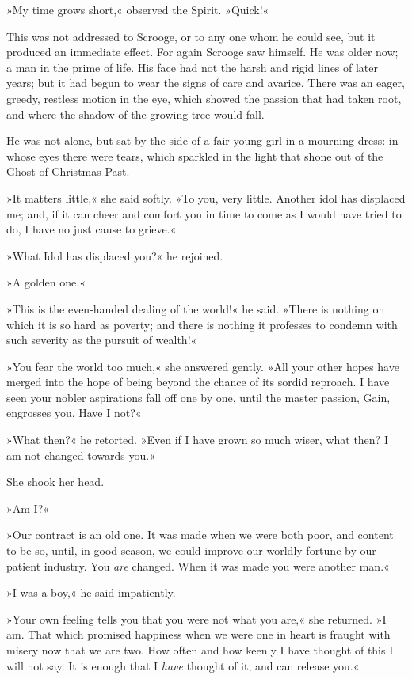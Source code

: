 »My time grows short,« observed the Spirit. »Quick!«

This was not addressed to Scrooge, or to any one whom he could see, but it produced an immediate effect. For again Scrooge saw himself. He was older now; a man in the prime of life. His face had not the harsh and rigid lines of later years; but it had begun to wear the signs of care and avarice. There was an eager, greedy, restless motion in the eye, which showed the passion that had taken root, and where the shadow of the growing tree would fall.

He was not alone, but sat by the side of a fair young girl in a mourning dress: in whose eyes there were tears, which sparkled in the light that shone out of the Ghost of Christmas Past.

»It matters little,« she said softly. »To you, very little. Another idol has displaced me; and, if it can cheer and comfort you in time to come as I would have tried to do, I have no just cause to grieve.«

»What Idol has displaced you?« he rejoined.

»A golden one.«

»This is the even-handed dealing of the world!« he said. »There is nothing on which it is so hard as poverty; and there is nothing it professes to condemn with such severity as the pursuit of wealth!«

»You fear the world too much,« she answered gently. »All your other hopes have merged into the hope of being beyond the chance of its sordid reproach. I have seen your nobler aspirations fall off one by one, until the master passion, Gain, engrosses you. Have I not?«

»What then?« he retorted. »Even if I have grown so much wiser, what then? I am not changed towards you.«

She shook her head.

»Am I?«

»Our contract is an old one. It was made when we were both poor, and content to be so, until, in good season, we could improve our worldly fortune by our patient industry. You \textit{are} changed. When it was made you were another man.«

»I was a boy,« he said impatiently.

»Your own feeling tells you that you were not what you are,« she returned. »I am. That which promised happiness when we were one in heart is fraught with misery now that we are two. How often and how keenly I have thought of this I will not say. It is enough that I \textit{have} thought of it, and can release you.«

